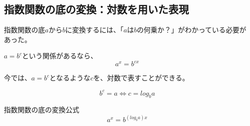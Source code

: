 \documentclass[../math-imaging]{subfiles}
\begin{document}
\subsection{指数関数の底の変換：対数を用いた表現}

指数関数の底$a$から$b$に変換するには、「$a$は$b$の何乗か？」がわかっている必要があった。

\begin{review}
  $a=b^c$という関係があるなら、
  \begin{equation}
    a^x = b^{cx}
  \end{equation}
\end{review}

今では、$a= b^c$となるような$c$を、対数で表すことができる。

\begin{equation}
  b^c = a \Longleftrightarrow  c = log_b a
\end{equation}

\begin{theorem}{指数関数の底の変換公式}
  \LARGE
  \begin{equation}
    a^x = b^{(log_b a)x}
  \end{equation}
\end{theorem}
\end{document}
